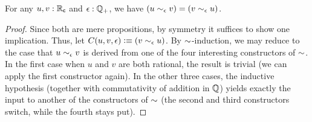 \begin{lem}\label{thm:RCsim-symmetric}
  For any $u,v:\mathbb{R}_\mathsf{c}$ and $\epsilon:\mathbb{Q}_{+}$, we have $(u\sim_{\epsilon} v) = (v\sim_{\epsilon} u)$.
\end{lem}
\begin{proof}
  Since both are mere propositions, by symmetry it suffices to show one implication.
  Thus, let $C(u,v,\epsilon) \vcentcolon\equiv (v\sim_{\epsilon} u)$.
  By $\mathord\sim$-induction, we may reduce to the case that $u\sim_{\epsilon} v$ is derived from one of the four interesting constructors of $\mathord\sim$.
  In the first case when $u$ and $v$ are both rational, the result is trivial (we can apply the first constructor again).
  In the other three cases, the inductive hypothesis (together with commutativity of addition in $\mathbb{Q}$) yields exactly the input to another of the constructors of $\mathord\sim$ (the second and third constructors switch, while the fourth stays put).
\end{proof}

